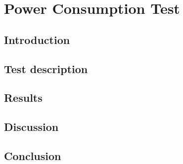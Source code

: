 \section{Power Consumption Test}
\subsection{Introduction}
\subsection{Test description}
\subsection{Results}
\subsection{Discussion}
\subsection{Conclusion}